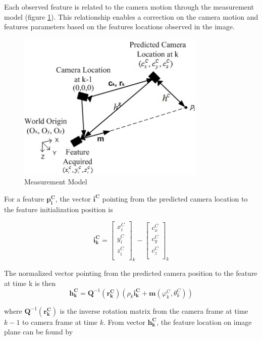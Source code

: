 Each observed feature is related to the camera motion through the
measurement model (figure \ref{fig:measurement_model}). This
relationship enables a correction on the camera motion and features
parameters based on the features locations observed in the image.

\begin{figure}[h]
\centering
\includegraphics[width=9cm, keepaspectratio=true]{./Figures/measurement_model.jpg}
\caption{Measurement Model}
\label{fig:measurement_model}
\end{figure}
\FloatBarrier
For a feature $\mathbf{p_{i}^{C}}$, the vector $\mathbf{i^{C}}$
pointing from the predicted camera location to the feature
initialization position is

\begin{equation}
\mathbf{i_{k}^{C}}=\begin{bmatrix}
x_{i}^{C} \\
y_{i}^{C} \\
z_{i}^{C} \\
\end{bmatrix}_{k}-\begin{bmatrix}
c_{x}^{C} \\
c_{y}^{C} \\
c_{z}^{C} \\
\end{bmatrix}_{k}
\end{equation}

The normalized vector pointing from the predicted camera position to the 
feature at time k is then 
\begin{equation}
  \mathbf{h_{k}^{C}}=\mathbf{Q}^{-1}\left(\mathbf{r_{k}^{C}}\right)
  \left(\rho_{k}\mathbf{i_{k}^{C}}+
    \mathbf{m}\left(\varphi_k^{C},\theta _{k}^{C}\right)\right)
\end{equation}

\noindent where $\mathbf{Q}^{-1}(\mathbf{r_{k}^{C}})$ is the inverse
rotation matrix from the camera frame at time $k-1$ to camera frame at
time $k$. From vector $\mathbf{h_{k}^{C}}$, the feature location on
image plane can be found by

